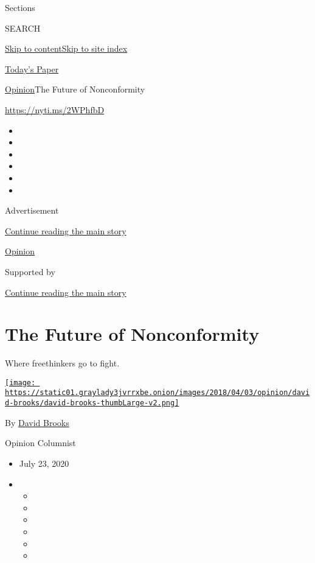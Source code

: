 Sections

SEARCH

\protect\hyperlink{site-content}{Skip to
content}\protect\hyperlink{site-index}{Skip to site index}

\href{https://myaccount.nytimes3xbfgragh.onion/auth/login?response_type=cookie\&client_id=vi}{}

\href{https://www.nytimes3xbfgragh.onion/section/todayspaper}{Today's
Paper}

\href{/section/opinion}{Opinion}\textbar{}The Future of Nonconformity

\url{https://nyti.ms/2WPhfbD}

\begin{itemize}
\item
\item
\item
\item
\item
\item
\end{itemize}

Advertisement

\protect\hyperlink{after-top}{Continue reading the main story}

\href{/section/opinion}{Opinion}

Supported by

\protect\hyperlink{after-sponsor}{Continue reading the main story}

\hypertarget{the-future-of-nonconformity}{%
\section{The Future of
Nonconformity}\label{the-future-of-nonconformity}}

Where freethinkers go to fight.

\href{https://www.nytimes3xbfgragh.onion/by/david-brooks}{\texttt{[image: https://static01.graylady3jvrrxbe.onion/images/2018/04/03/opinion/david-brooks/david-brooks-thumbLarge-v2.png]}}

By \href{https://www.nytimes3xbfgragh.onion/by/david-brooks}{David
Brooks}

Opinion Columnist

\begin{itemize}
\item
  July 23, 2020
\item
  \begin{itemize}
  \item
  \item
  \item
  \item
  \item
  \item
  \end{itemize}
\end{itemize}

